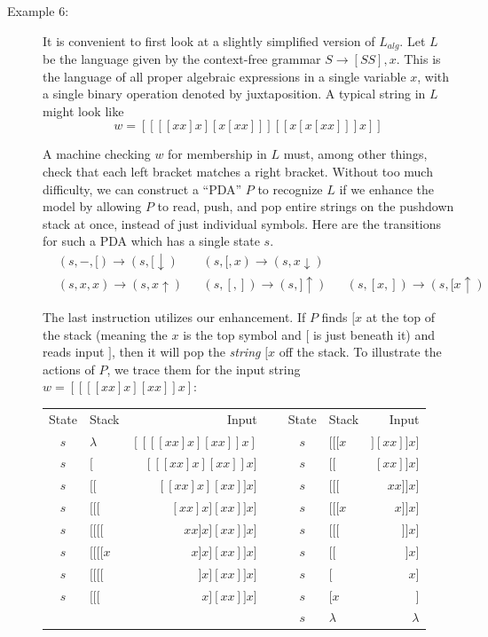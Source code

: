 \documentclass{article}
\begin{document}
\begin{description}

\item[Example 6:] It is convenient to first look at a slightly simplified version of $L_{alg}$. Let $L$ be the language given by the context-free grammar $S \to [SS],x$. This is the language of all proper algebraic expressions in a single variable $x$, with a single binary operation denoted by juxtaposition. A typical string in $L$ might look like
  \begin{equation*}
  w = [[[[xx]x][x[xx]]][[x[x[xx]]]x]]
  \end{equation*}

  A machine checking $w$ for membership in $L$ must, among other things, check that each left bracket matches a right bracket. Without too much difficulty, we can construct a ``PDA'' $P$ to recognize $L$ if we enhance the model by allowing $P$ to read, push, and pop entire strings on the pushdown stack at once, instead of just individual symbols. Here are the transitions for such a PDA which has a single state $s$.
  \begin{align*}
  & (s,-,[) \to (s,[ \downarrow) & & (s,[,x) \to (s,x \downarrow) \\
  & (s,x,x) \to (s,x \uparrow)   & & (s,[,]) \to (s,] \uparrow)   & & (s,[x,]) \to (s,[x \uparrow)
  \end{align*}

  The last instruction utilizes our enhancement. If $P$ finds $[x$ at the top of the stack (meaning the $x$ is the top symbol and $[$ is just beneath it) and reads input $]$, then it will pop the \emph{string} $[x$ off the stack. To illustrate the actions of $P$, we trace them for the input string $w = [[[[xx]x][xx]]x]$:

  \begin{center}
  \begin{tabular}{clrcclr}
  State & Stack     & Input             & \ & State & Stack     & Input      \\
   $s$  & $\lambda$ & $[[[[xx]x][xx]]x]$ & &   $s$  & $[[[x$    & $][xx]]x]$ \\ 
   $s$  & $[$       &  $[[[xx]x][xx]]x]$ & &   $s$  & $[[$      &  $[xx]]x]$ \\ 
   $s$  & $[[$      &   $[[xx]x][xx]]x]$ & &   $s$  & $[[[$     &   $xx]]x]$ \\ 
   $s$  & $[[[$     &    $[xx]x][xx]]x]$ & &   $s$  & $[[[x$    &    $x]]x]$ \\ 
   $s$  & $[[[[$    &     $xx]x][xx]]x]$ & &   $s$  & $[[[$     &     $]]x]$ \\ 
   $s$  & $[[[[x$   &      $x]x][xx]]x]$ & &   $s$  & $[[$      &      $]x]$ \\ 
   $s$  & $[[[[$    &       $]x][xx]]x]$ & &   $s$  & $[$       &       $x]$ \\ 
   $s$  & $[[[$     &        $x][xx]]x]$ & &   $s$  & $[x$      &        $]$ \\ 
        &           &                    & &   $s$  & $\lambda$ &  $\lambda$ 
  \end{tabular}
  \end{center}


\end{description}
\end{document}
